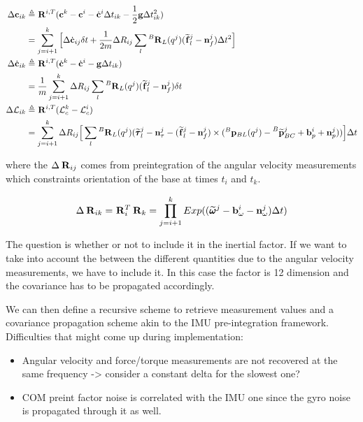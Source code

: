 \documentclass[11pt]{article}
\newcommand{\Rot}[2]{\prescript{#1}{}{\bfR}_{#2}}
\newcommand{\noise}{\bfn}
\newcommand{\bias}{\bfb}
\newcommand{\posi}[2]{\prescript{#1}{}{\bfp}_{#2}}
\newcommand{\posim}[2]{\prescript{#1}{}{\widetilde{\bfp}}_{#2}}
\newcommand{\angvelm}[2]{\prescript{#1}{}{\widetilde{\pmb{\omega}}}_{#2}}
\newcommand{\forcem}[2]{\prescript{#1}{}{\widetilde{\bff}}_{#2}}
\newcommand{\torquem}[2]{\prescript{#1}{}{\widetilde{\pmb{\tau}}}_{#2}}
\newcommand{\AM}{\mathcal{L}}
\newcommand{\COM}{\bfc}
\newcommand{\COMd}{\dot{\bfc}}
\newcommand{\grav}{\bfg}
\begin{document}
\begin{equation}
\begin{split}
    \Delta \COM_{ik} &\triangleq \Rot{}{}^{i,T} (\COM^k - \COM^i - \COMd{}{}^i \Delta t_{ik} - \frac{1}{2}\grav \Delta t_{ik}^2) 
    \\
    &= \sum_{j=i+1}^{k} \Big[ \Delta \COMd_{ij} \delta t + \frac{1}{2m} \Delta R_{ij} \sum_l \Rot{B}{L}(q^{j}) (\forcem{}{l}^{j} - \noise_f^{j}) \Delta t^2 \Big]
\\
    \Delta \COMd_{ik} &\triangleq \Rot{}{}^{i,T} (\COMd^{k} - \COMd^{i} - \bfg \Delta t_{ik})
\\
    &= \frac{1}{m} \sum_{j=i+1}^{k} \Delta R_{ij} \sum_l \Rot{B}{L}(q^{j}) (\forcem{}{l}^{j} - \noise_f^{j}) \delta t 
\\
    \Delta \AM_{ik} &\triangleq \Rot{}{}^{i,T} (\AM_c^{k} - \AM_c^{i})
\\
     &=  \sum_{j=i+1}^{k} \Delta R_{ij} \Big[ 
    \sum_l \Rot{B}{L}(q^{j}) (\torquem{}{l}^{j} - \noise_{\tau}^{j} - (\forcem{}{l}^{j} - \noise_f^{j}) \times (\posi{B}{BL}(q^j) - \posim{B}{BC}^j + \bias_{p}^i + \noise_p^j)) \Big]  \Delta t
\end{split}
\label{eq:DeltaFT}
\end{equation}

where the $\Delta \Rot{}{ij}$ comes from preintegration of the angular velocity measurements which constraints orientation of the base at times $t_i$ and $t_k$.

\begin{equation}
    \Delta \Rot{}{ik} = \Rot{}{i}^T \Rot{}{k}
    = \prod_{j=i+1}^{k} Exp((\angvelm{}{}^j - \bias_{\omega}^i - \noise_{\omega}^j)\Delta t)
    \label{eq:DeltaR}
\end{equation}

The question is whether or not to include it in the inertial factor. If we want to take into account the between the different quantities due to the angular velocity measurements, we have to include it. In this case the factor is 12 dimension and the covariance has to be propagated accordingly.


We can then define a recursive scheme to retrieve measurement values and a covariance propagation scheme akin to the IMU pre-integration framework. 
Difficulties that might come up during implementation:

\begin{itemize}
    \item Angular velocity and force/torque measurements are not recovered at the same frequency -> consider a constant delta for the slowest one?
    \item COM preint factor noise is correlated with the IMU one since the gyro noise is propagated through it as well.
\end{itemize}
\end{document}
